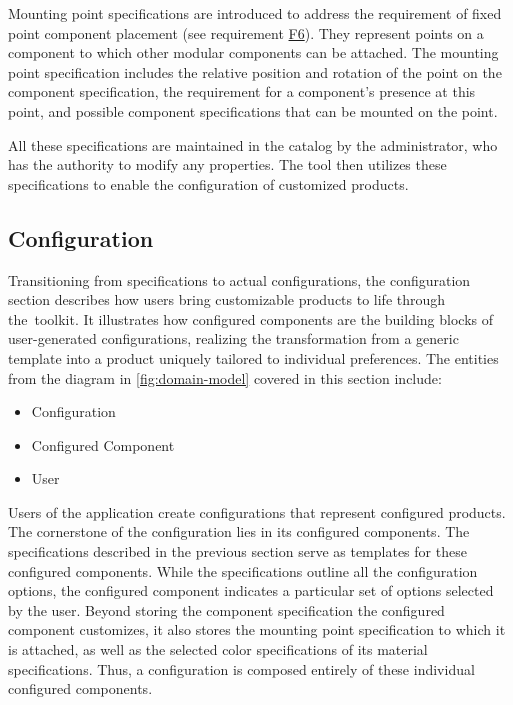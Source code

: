 Mounting point specifications are introduced to address the requirement of fixed point component placement (see requirement \hyperref[itm:F6]{F6}). They represent points on a component to which other modular components can be attached. The mounting point specification includes the relative position and rotation of the point on the component specification, the requirement for a component's presence at this point, and possible component specifications that can be mounted on the point.

All these specifications are maintained in the catalog by the administrator, who has the authority to modify any properties. The tool then utilizes these specifications to enable the configuration of customized products.


\subsection{Configuration}

Transitioning from specifications to actual configurations, the configuration section describes how users bring customizable products to life through the~toolkit.
It illustrates how configured components are the building blocks of user-generated configurations, realizing the transformation from a generic template into a product uniquely tailored to individual preferences.
The entities from the diagram in \autoref{fig:domain-model} covered in this section include:
\begin{itemize}[label=\rectanglebullet]
    \item Configuration
    \item Configured Component
    \item User
\end{itemize}

Users of the application create configurations that represent configured products. The cornerstone of the configuration lies in its configured components. The specifications described in the previous section serve as templates for these configured components. While the specifications outline all the configuration options, the configured component indicates a particular set of options selected by the user. Beyond storing the component specification the configured component customizes, it also stores the mounting point specification to which it is attached, as well as the selected color specifications of its material specifications. Thus, a configuration is composed entirely of these individual configured components.


